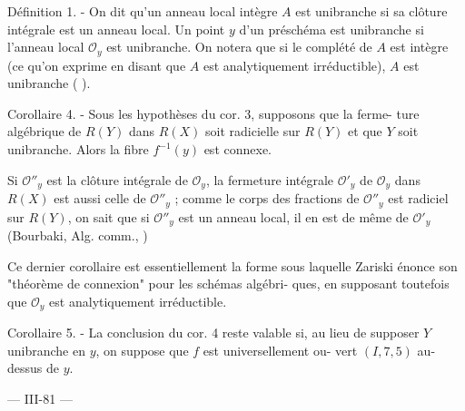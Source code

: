 Définition 1. - On dit qu'un anneau local intègre $A$ est unibranche
si sa clôture intégrale est un anneau local. Un point $y$
d'un préschéma est unibranche si l'anneau local $\mathcal{O}_y$ est unibranche.
On notera que si le complété de $A$ est intègre (ce qu'on exprime en
disant que $A$ est analytiquement irréductible), $A$ est unibranche (
).

Corollaire 4. - Sous les hypothèses du cor. 3, supposons que la ferme-
ture algébrique de $R(Y)$ dans $R(X)$ soit radicielle sur $R(Y)$
et que $Y$ soit unibranche. Alors la fibre $f^{-1}(y)$ est connexe.

Si $\mathcal{O}''_y$ est la clôture intégrale de $\mathcal{O}_y$, la fermeture intégrale $\mathcal{O}'_y$ de
$\mathcal{O}_y$ dans $R(X)$ est aussi celle de $\mathcal{O}''_y$ ; comme le corps
des fractions de $\mathcal{O}''_y$ est radiciel sur $R(Y)$, on sait que si $\mathcal{O}''_y$ est
un anneau local, il en est de même de $\mathcal{O}'_y$ (Bourbaki, Alg. comm., )

Ce dernier corollaire est essentiellement la forme sous laquelle
Zariski énonce son "théorème de connexion" pour les schémas algébri-
ques, en supposant toutefois que $\mathcal{O}_y$ est analytiquement irréductible.

Corollaire 5. - La conclusion du cor. 4 reste valable si, au lieu de
supposer $Y$ unibranche en $y$, on suppose que $f$ est universellement ou-
vert $(I, 7, 5)$ au-dessus de $y$.

\newpage


--- III-81 ---

